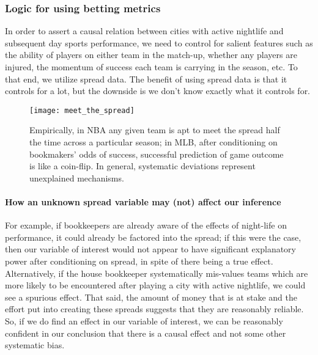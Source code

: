 \documentclass[letterpaper,12pt]{article}
\begin{document}

\subsubsection{Logic for using betting metrics}
In order to assert a causal relation between cities with active nightlife 
and subsequent day sports performance, we need to control for salient
features such as the ability of players on either team in the match-up,
whether any players are injured, the momentum of success each team is carrying
in the season, etc. To that end, we utilize spread data.\citep{anderson} The benefit of using spread data is that it controls for a lot, but the downside is
we don't know exactly what it controls for.

\begin{figure}[ht]
  \centering
  \texttt{[image: meet\_the\_spread]}
  \label{fig: meet the spread}
  \caption{Empirically, in NBA any given team is apt to meet the spread
half the time across a particular season; in MLB, after conditioning on bookmakers' odds of
success, successful prediction of game outcome is like a coin-flip. 
In general, systematic deviations represent
unexplained mechanisms. }
\end{figure}

\paragraph{How an unknown spread variable may (not) affect our inference}
For example, if bookkeepers
are already aware of the effects of night-life on performance, it could
already be factored into the spread; if this were the case, then our variable
of interest would not appear to have significant explanatory power
after conditioning on spread, in spite of there being
a true effect. Alternatively,
if the house bookkeeper systematically mis-values
teams which are more likely to be encountered after playing a city with active nightlife,
we could see a spurious effect. 
That said, the amount of money that is at stake and the effort put into creating these spreads 
suggests that they are reasonably reliable. 
So, if we do find an effect in our variable of interest,
we can be reasonably confident in our conclusion that there is a causal effect and not some other systematic bias.
\end{document}
